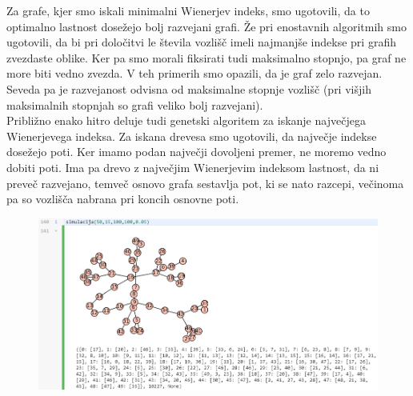 \documentclass[12pt,a4paper]{amsart}
\theoremstyle{definition} %
\theoremstyle{plain} %
\begin{document}
Za grafe, kjer smo iskali minimalni Wienerjev indeks, smo ugotovili, da to optimalno lastnost dosežejo bolj razvejani grafi. Že pri enostavnih algoritmih smo ugotovili, da bi pri določitvi le števila vozlišč imeli najmanjše indekse pri grafih zvezdaste oblike. Ker pa smo morali fiksirati tudi maksimalno stopnjo, pa graf ne more biti vedno zvezda. V teh primerih smo opazili, da je graf zelo razvejan. Seveda pa je razvejanost odvisna od maksimalne stopnje vozlišč (pri višjih maksimalnih stopnjah so grafi veliko bolj razvejani).
\\
Približno enako hitro deluje tudi genetski algoritem za iskanje največjega Wienerjevega indeksa. Za iskana drevesa smo ugotovili, da največje indekse dosežejo poti.
Ker imamo podan največji dovoljeni premer, ne moremo vedno dobiti poti. Ima pa drevo z največjim Wienerjevim indeksom lastnost, da ni preveč razvejano, temveč osnovo grafa sestavlja pot, ki se nato razcepi, večinoma pa so vozlišča nabrana pri koncih osnovne poti.

\begin{figure}[ht]
\centering
\includegraphics[width=1\textwidth]{slika8}
\end{figure}
\end{document}
